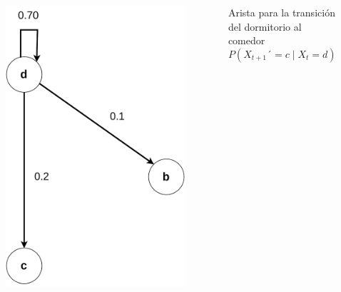 \documentclass[11pt]{beamer}
\begin{document}
\begin{frame}
	\begin{columns}
		\begin{column}{0.5\textwidth}
			\vspace{-0.8cm}
			\begin{figure}
				\includegraphics[scale=0.5]{images/markov_tres.pdf}
			\end{figure}
		\end{column}
		\begin{column}{0.5\textwidth}
		Arista para la transición del dormitorio al comedor
					\[P(X_{t+1}´ = c \mid X_t = d)=0.2\]
		\end{column}

	\end{columns}
	
\end{frame}
\end{document}
